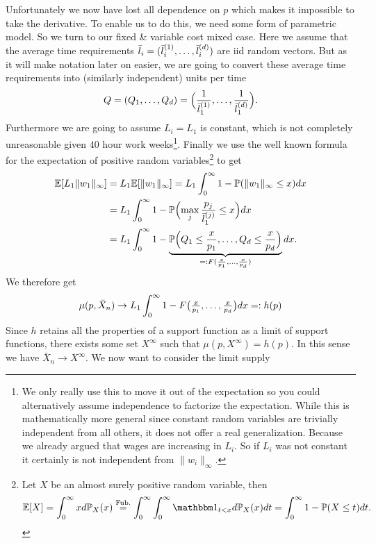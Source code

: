 Unfortunately we now have lost all dependence on \(p\) which makes it impossible
to take the derivative. To enable us to do this, we need some form of parametric
model. So we turn to our fixed \& variable cost mixed case. Here we assume that
the average time requirements \(\bar{l}_i= (\bar{l}_i^{(1)}, \dots,
\bar{l}_i^{(d)})\) are iid random vectors. But as it will make notation
later on easier, we are going to convert these average time requirements into
(similarly independent) units per time
\[
	Q = (Q_1,\dots, Q_d)
	= \Bigl(\frac1{\bar{l}_1^{(1)}}, \dots, \frac1{\bar{l}_1^{(d)}}\Bigr).
\]
Furthermore we are going to assume \(L_i=L_1\) is constant, which is not
completely unreasonable given \(40\) hour work weeks\footnote{
	We only really use this to move it out of the expectation so you could
	alternatively assume independence to factorize the expectation. While this
	is mathematically more general since constant random variables are trivially
	independent from all others, it does not offer a real generalization. Because
	we already argued that wages are increasing in \(L_i\). So if \(L_i\) was
	not constant it certainly is not independent from \(\|w_i\|_\infty\).
}.
Finally we use the well known formula for the expectation of positive random
variables\footnote{
	Let \(X\) be an almost surely positive random variable, then
	\[
		\E[X]	= \int_0^\infty x d\Pr_X(x)
		\overset{\text{Fub.}}= \int_0^\infty \int_0^\infty \ind_{t < x}d\Pr_X(x)dt
		= \int_0^\infty 1- \Pr(X \le t)dt.
	\]
} to get
\begin{align*}
	\mathbb{E}[L_1\|w_1\|_\infty]
	&= L_1 \mathbb{E}[\|w_1\|_\infty]
	= L_1 \int_0^\infty 1 - \mathbb{P}(\|w_1\|_\infty \le x)dx\\
	&= L_1 \int_0^\infty 1- \mathbb{P}\Bigl(\max_j \frac{p_j}{\bar{l}_1^{(j)}} \le x\Bigr)dx\\
	&= L_1 \int_0^\infty 1- 
	\underbrace{
		\mathbb{P}\Bigl(Q_1 \le \frac{x}{p_1}, \dots, Q_d \le \frac{x}{p_d}\Bigr)
	}_{=: F(\frac{x}{p_1},\dots,\frac{x}{p_d})}dx.
\end{align*}
We therefore get
\[
	\mu(p, \bar{X}_n)
	\to L_1\int_0^\infty 1- F\bigl(\tfrac{x}{p_1},\dots,\tfrac{x}{p_d}\bigr)dx
	=: h(p)
\]
Since \(h\) retains all the properties of a support function as a limit of
support functions, there exists some set \(X^\infty\) such that \(\mu(p,
X^\infty)=h(p)\). In this
sense we have \(\bar{X}_n\to X^\infty\). We now want to consider the limit
supply
